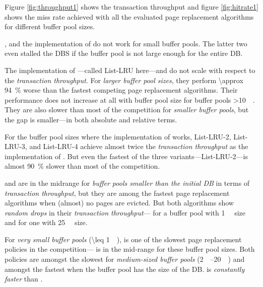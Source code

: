 
    Figure \ref{fig:throughput1} shows the transaction throughput and figure \ref{fig:hitrate1} shows the miss rate achieved with all the evaluated page replacement algorithms for different buffer pool sizes.

    ,  and the  implementation of  do not work for small buffer pools. The latter two even stalled the DBS if the buffer pool is not large enough for the entire DB.

    The  implementation of ---called List-LRU here---and  do not scale with respect to the \emph{transaction throughput}. For \emph{larger buffer pool sizes}, they perform \SI{\approx 94}{\percent} worse than the fastest competing page replacement algorithms. Their performance does not increase at all with buffer pool size for buffer pools \SI{>10}{\giga\byte}. They are also slower than most of the competition for \emph{smaller buffer pools}, but the gap is smaller---in both absolute and relative terms.

    For the buffer pool sizes where the  implementation of  works, List-LRU-2, List-LRU-3, and List-LRU-4 achieve almost twice the \emph{transaction throughput} as the  implementation of . But even the fastest of the three variants---List-LRU-2---is almost \SI{90}{\percent} slower than most of the competition.

     and  are in the midrange for \emph{buffer pools smaller than the initial DB} in terms of \emph{transaction throughput}, but they are among the fastest page replacement algorithms when (almost) no pages are evicted. But both algorithms show \emph{random drops} in their \emph{transaction throughput}--- for a buffer pool with \SI{1}{\giga\byte} size and  for one with \SI{25}{\giga\byte} size.

    For \emph{very small buffer pools} (\SI{\leq 1}{\giga\byte}),  is one of the slowest page replacement policies in the competition--- is in the mid-range for these buffer pool sizes. Both policies are amongst the slowest for \emph{medium-sized buffer pools} (\SIrange{2}{20}{\giga\byte}) and amongst the fastest when the buffer pool has the size of the DB.  is \emph{constantly faster} than .

